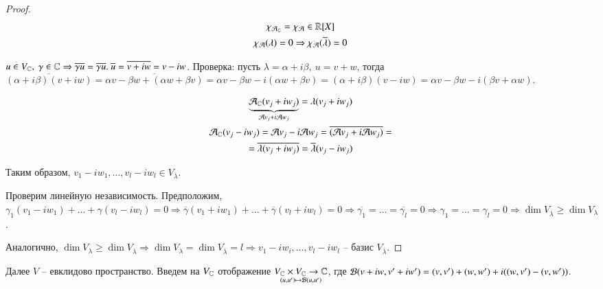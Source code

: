 \documentclass[main]{subfiles}
\begin{document}
\begin{proof}
    \begin{gather*}
        \chi_{\mathcal{A}_{\mathbb{C}}} = \chi_{\mathcal{A}} \in \mathbb{R}[X] \\
        \chi_{\mathcal{A}}(\lambda) = 0 \Rightarrow \chi_{\mathcal{A}}(\overline{\lambda}) = 0 \\
    \end{gather*}
    
    \begin{remark}
        $u \in V_{\mathbb{C}}, \ \gamma \in \mathbb{C} \Rightarrow \overline{\gamma u} = \overline{\gamma} \overline{u}. \ \overline{u} = \overline{v + iw} = v - iw$.
        Проверка: пусть $\lambda = \alpha + i\beta, \ u = v + w$, тогда $\overline{(\alpha + i\beta)(v + iw)} =
         \overline{\alpha v - \beta w + (\alpha w + \beta v)} = \alpha v - \beta w - i(\alpha w + \beta v) = (\alpha + i\beta)(v - iw) =
        \alpha v - \beta w -i(\beta v + \alpha w)$.
    \end{remark}

    \begin{gather*}
        \underbrace{\mathcal{A}_{\mathbb{C}}(v_j + iw_j)}_{\mathcal{A} v_j + i\mathcal{A} w_j} = \lambda(v_j + iw_j) \\
        \mathcal{A}_{\mathbb{C}}(v_j - iw_j) = \mathcal{A} v_j - i\mathcal{A} w_j = \overline{(\mathcal{A} v_j + i\mathcal{A} w_j)} = \\
        = \overline{\lambda(v_j + iw_j)} = \overline{\lambda}(v_j-iw_j)
    \end{gather*}

    Таким образом, $v_1 - iw_1, \ldots, v_l - iw_l \in V_{\overline{\lambda}}$.

    Проверим линейную независимость. Предположим, $\gamma_1(v_1 - iw_1) + \ldots +
    \gamma(v_l - iw_l) = 0 \Rightarrow \overline{\gamma}(v_1 + iw_1) + \ldots + \overline{\gamma}(v_l + iw_l) = 0 \Rightarrow
    \overline{\gamma_1} = \ldots = \overline{\gamma_l} = 0 \Rightarrow \gamma_1 = \ldots = \gamma_l = 0 \Rightarrow
    \dim V_{\overline{\lambda}} \geq \dim V_{\lambda}$.

    Аналогично, $\dim V_{\lambda} \geq \dim V_{\overline{\lambda}} \Rightarrow
    \dim V_{\lambda} = \dim V_{\overline{\lambda}} = l \Rightarrow 
    v_1 - iw_i, \ldots, v_l - iw_l$ -- базис $V_{\overline{\lambda}}$.
\end{proof}

    Далее $V$ -- евклидово пространство. Введем на $V_{\mathbb{C}}$ отображение $\underset{(u, u') \mapsto \mathcal{B}(u, u')}{V_{\mathbb{C}}\times V_{\mathbb{C}}\to\mathbb{C}}$, 
    где $\mathcal{B}(v+iw, v'+iw') = (v, v') + (w, w') + i((w, v') - (v, w'))$.
\end{document}
